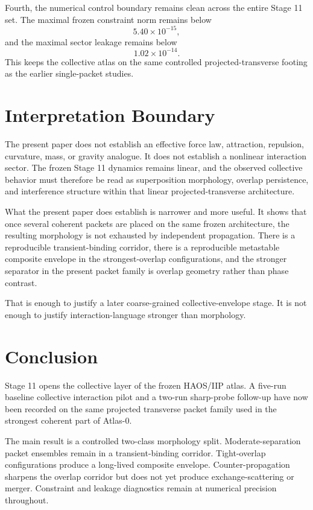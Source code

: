 \documentclass[11pt]{article}
\begin{document}
Fourth, the numerical control boundary remains clean across the entire Stage 11 set. The maximal frozen constraint norm remains below
\begin{equation}
5.40\times 10^{-15},
\end{equation}
and the maximal sector leakage remains below
\begin{equation}
1.02\times 10^{-14}.
\end{equation}
This keeps the collective atlas on the same controlled projected-transverse footing as the earlier single-packet studies.

\section{Interpretation Boundary}
The present paper does not establish an effective force law, attraction, repulsion, curvature, mass, or gravity analogue. It does not establish a nonlinear interaction sector. The frozen Stage 11 dynamics remains linear, and the observed collective behavior must therefore be read as superposition morphology, overlap persistence, and interference structure within that linear projected-transverse architecture.

What the present paper does establish is narrower and more useful. It shows that once several coherent packets are placed on the same frozen architecture, the resulting morphology is not exhausted by independent propagation. There is a reproducible transient-binding corridor, there is a reproducible metastable composite envelope in the strongest-overlap configurations, and the stronger separator in the present packet family is overlap geometry rather than phase contrast.

That is enough to justify a later coarse-grained collective-envelope stage. It is not enough to justify interaction-language stronger than morphology.

\section{Conclusion}
Stage 11 opens the collective layer of the frozen HAOS/IIP atlas. A five-run baseline collective interaction pilot and a two-run sharp-probe follow-up have now been recorded on the same projected transverse packet family used in the strongest coherent part of Atlas-0.

The main result is a controlled two-class morphology split. Moderate-separation packet ensembles remain in a transient-binding corridor. Tight-overlap configurations produce a long-lived composite envelope. Counter-propagation sharpens the overlap corridor but does not yet produce exchange-scattering or merger. Constraint and leakage diagnostics remain at numerical precision throughout.
\end{document}
